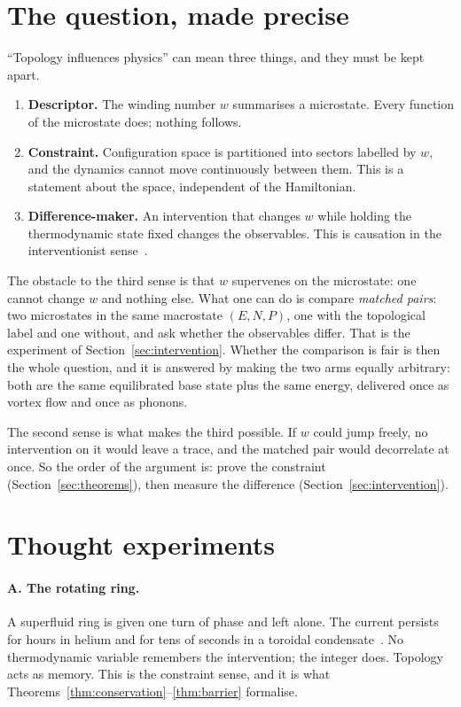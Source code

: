 \documentclass[11pt,a4paper]{article}
\begin{document}
\section{The question, made precise}

``Topology influences physics'' can mean three things, and they must be kept apart.
\begin{enumerate}[leftmargin=*]
\item \textbf{Descriptor.} The winding number $w$ summarises a microstate. Every function of the
  microstate does; nothing follows.
\item \textbf{Constraint.} Configuration space is partitioned into sectors labelled by $w$, and the
  dynamics cannot move continuously between them. This is a statement about the space, independent
  of the Hamiltonian.
\item \textbf{Difference-maker.} An intervention that changes $w$ while holding the thermodynamic
  state fixed changes the observables. This is causation in the interventionist
  sense~\cite{Woodward2003,Pearl2009}.
\end{enumerate}
The obstacle to the third sense is that $w$ supervenes on the microstate: one cannot change $w$ and
nothing else. What one can do is compare \emph{matched pairs}: two microstates in the same macrostate
$(E,N,P)$, one with the topological label and one without, and ask whether the observables differ.
That is the experiment of Section~\ref{sec:intervention}. Whether the comparison is fair is then the
whole question, and it is answered by making the two arms equally arbitrary: both are the same
equilibrated base state plus the same energy, delivered once as vortex flow and once as phonons.

The second sense is what makes the third possible. If $w$ could jump freely, no intervention on it
would leave a trace, and the matched pair would decorrelate at once. So the order of the argument is:
prove the constraint (Section~\ref{sec:theorems}), then measure the difference
(Section~\ref{sec:intervention}).

\section{Thought experiments}\label{sec:thought}

\paragraph{A. The rotating ring.} A superfluid ring is given one turn of phase and left alone. The
current persists for hours in helium and for tens of seconds in a toroidal
condensate~\cite{Ramanathan2011}. No thermodynamic variable remembers the intervention; the integer
does. Topology acts as memory. This is the constraint sense, and it is what
Theorems~\ref{thm:conservation}--\ref{thm:barrier} formalise.
\end{document}
